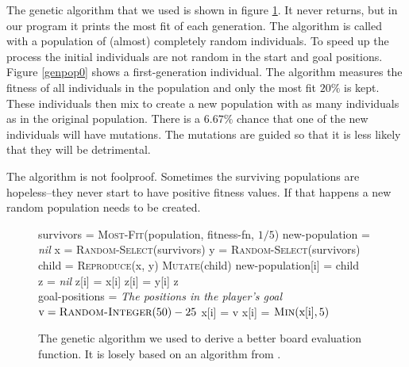 \documentclass[a4paper,11pt]{article}
\begin{document}
The genetic algorithm that we used is shown in figure \ref{genalg}. It
never returns, but in our program it prints the most fit of each
generation. The algorithm is called with a population of (almost)
completely random individuals. To speed up the process the initial
individuals are not random in the start and goal positions. Figure
\ref{genpop0} shows a first-generation individual. The algorithm
measures the fitness of all individuals in the population and only the
most fit $20\%$ is kept. These individuals then mix to create a new
population with as many individuals as in the original population.
There is a $6.67\%$ chance that one of the new individuals will have
mutations. The mutations are guided so that it is less likely that
they will be detrimental.

The algorithm is not foolproof. Sometimes the surviving populations
are hopeless--they never start to have positive fitness values. If
that happens a new random population needs to be created.

\begin{figure}
\begin{algorithmic}
\While{$\top$}
 \State survivors = \textsc{Most-Fit}(population, fitness-fn, $1/5$)
 \State new-population = \emph{nil}
   \State x = \textsc{Random-Select}(survivors)
   \State y = \textsc{Random-Select}(survivors)
   \State child = \textsc{Reproduce}(x, y)
     \State \textsc{Mutate}(child)
   \EndIf
   \State new-population[i] = child
 \EndFor
\EndWhile
\EndFunction
\\
\State z = \emph{nil}
  \State z[i] = x[i]
 \Else
  \State z[i] = y[i]
 \EndIf
\EndFor
\State \Return z
\EndFunction
\\
\State goal-positions = \emph{The positions in the player's goal}
  \State $\textrm{v} = \textsc{Random-Integer}(50) - 25$
    \State x[i] = v
  \EndIf
 \EndIf
\EndFor
{}
 \State x[i] = $\textsc{Min}(\textrm{x}[\textrm{i}], 5)$
\EndFor
\EndFunction
\end{algorithmic}

\caption{The genetic algorithm we used to derive a better board
  evaluation function. It is losely based on an algorithm from
  \cite{aimodern}.}
\label{genalg}
\end{figure}
\end{document}
